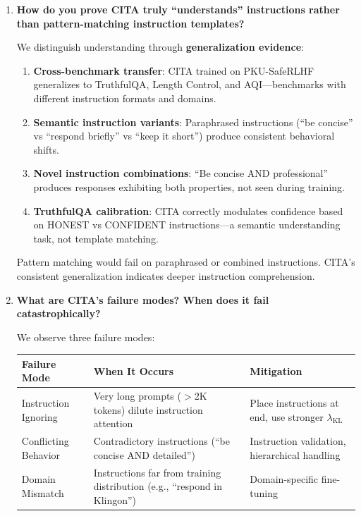 \begin{enumerate}[label=\textbf{Q\arabic*.}, leftmargin=*, itemsep=8pt]
\vspace{4mm}

\item \textbf{How do you prove CITA truly ``understands'' instructions rather than pattern-matching instruction templates?}

 We distinguish understanding through \textbf{generalization evidence}:

\begin{enumerate}[leftmargin=*,itemsep=2pt]
    \item \textbf{Cross-benchmark transfer}: CITA trained on PKU-SafeRLHF generalizes to TruthfulQA, Length Control, and AQI---benchmarks with different instruction formats and domains.

    \item \textbf{Semantic instruction variants}: Paraphrased instructions (``be concise'' vs ``respond briefly'' vs ``keep it short'') produce consistent behavioral shifts.

    \item \textbf{Novel instruction combinations}: ``Be concise AND professional'' produces responses exhibiting both properties, not seen during training.

    \item \textbf{TruthfulQA calibration}: CITA correctly modulates confidence based on HONEST vs CONFIDENT instructions---a semantic understanding task, not template matching.
\end{enumerate}

Pattern matching would fail on paraphrased or combined instructions. CITA's consistent generalization indicates deeper instruction comprehension.

\vspace{4mm}

\item \textbf{What are CITA's failure modes? When does it fail catastrophically?}

 We observe three failure modes:

\begin{table}[ht!]
\centering
\small
\renewcommand{\arraystretch}{1.2}
\begin{tabular}{@{}l>{\raggedright\arraybackslash}p{5cm}>{\raggedright\arraybackslash}p{5cm}@{}}
\toprule
\textbf{Failure Mode} & \textbf{When It Occurs} & \textbf{Mitigation} \\
\midrule
Instruction Ignoring & Very long prompts ($>$2K tokens) dilute instruction attention & Place instructions at end, use stronger $\lambda_{\text{KL}}$ \\ \hline
Conflicting Behavior & Contradictory instructions (``be concise AND detailed'') & Instruction validation, hierarchical handling \\ \hline
Domain Mismatch & Instructions far from training distribution (e.g., ``respond in Klingon'') & Domain-specific fine-tuning \\
\bottomrule
\end{tabular}
\end{table}


\end{enumerate}
